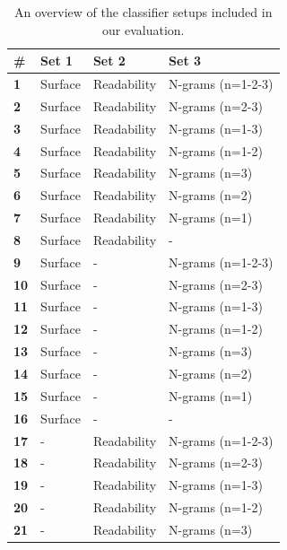 \documentclass[
10pt, %
a4paper, %
oneside, %
headinclude,footinclude, %
] {book}%
\begin{document}
\begin{table}[]
\caption{An overview of the classifier setups included in our evaluation.}
\centering
\begin{tabular}{llll}
\hline
\#          & \textbf{Set 1} & \textbf{Set 2} & \textbf{Set 3}    \\ \hline
\textbf{1}  & Surface        & Readability    & N-grams (n=1-2-3) \\
\textbf{2}  & Surface        & Readability    & N-grams (n=2-3)   \\
\textbf{3}  & Surface        & Readability    & N-grams (n=1-3)   \\
\textbf{4}  & Surface        & Readability    & N-grams (n=1-2)   \\
\textbf{5}  & Surface        & Readability    & N-grams (n=3)     \\
\textbf{6}  & Surface        & Readability    & N-grams (n=2)     \\
\textbf{7}  & Surface        & Readability    & N-grams (n=1)     \\
\textbf{8}  & Surface        & Readability    & -                 \\
\textbf{9}  & Surface        & -              & N-grams (n=1-2-3) \\
\textbf{10} & Surface        & -                & N-grams (n=2-3)   \\
\textbf{11} & Surface        & -              & N-grams (n=1-3)   \\
\textbf{12} & Surface        & -              & N-grams (n=1-2)   \\
\textbf{13} & Surface        & -              & N-grams (n=3)     \\
\textbf{14} & Surface        & -              & N-grams (n=2)     \\
\textbf{15} & Surface        & -              & N-grams (n=1)     \\
\textbf{16} & Surface        & -              & -                 \\
\textbf{17} & -              & Readability    & N-grams (n=1-2-3) \\
\textbf{18} & -              & Readability    & N-grams (n=2-3)   \\
\textbf{19} & -              & Readability    & N-grams (n=1-3)   \\
\textbf{20} & -              & Readability    & N-grams (n=1-2)   \\
\textbf{21} & -              & Readability    & N-grams (n=3)     \\

\end{tabular}
\end{table}
\end{document}

